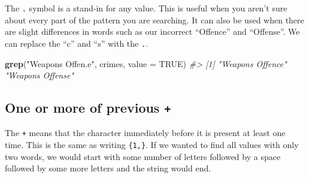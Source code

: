 \documentclass[
  12pt,
]{book}
\newenvironment{Shaded}{\begin{snugshade}}{\end{snugshade}}
\newcommand{\CommentTok}[1]{\textcolor[rgb]{0.37,0.37,0.37}{\textit{#1}}}
\newcommand{\DataTypeTok}[1]{\textcolor[rgb]{0.27,0.27,0.27}{#1}}
\newcommand{\KeywordTok}[1]{\textcolor[rgb]{0.27,0.27,0.27}{\textbf{#1}}}
\newcommand{\NormalTok}[1]{#1}
\newcommand{\OtherTok}[1]{\textcolor[rgb]{0.37,0.37,0.37}{#1}}
\newcommand{\StringTok}[1]{\textcolor[rgb]{0.5,0.5,0.5}{#1}}
\begin{document}
The \texttt{.} symbol is a stand-in for any value. This is useful when you aren't sure about every part of the pattern you are searching. It can also be used when there are slight differences in words such as our incorrect ``Offence'' and ``Offense''. We can replace the ``c'' and ``s'' with the \texttt{.}.

\begin{Shaded}
\begin{Highlighting}[]
\KeywordTok{grep}\NormalTok{(}\StringTok{"Weapons Offen.e"}\NormalTok{, crimes, }\DataTypeTok{value =} \OtherTok{TRUE}\NormalTok{)}
\CommentTok{\#\textgreater{} [1] "Weapons Offence" "Weapons Offense"}
\end{Highlighting}
\end{Shaded}

\hypertarget{one-or-more-of-previous}{%
\subsection{\texorpdfstring{One or more of previous \texttt{+}}{One or more of previous +}}\label{one-or-more-of-previous}}

The \texttt{+} means that the character immediately before it is present at least one time. This is the same as writing \texttt{\{1,\}}. If we wanted to find all values with only two words, we would start with some number of letters followed by a space followed by some more letters and the string would end.

\begin{Shaded}
\end{Shaded}
\end{document}
